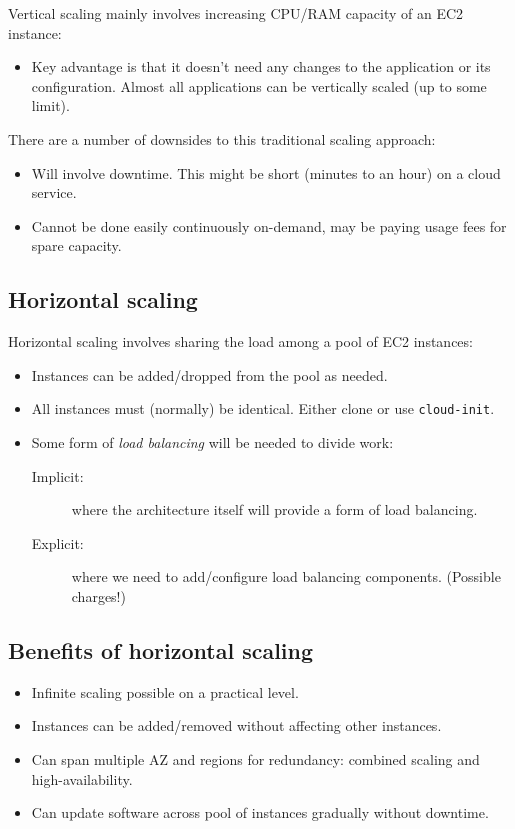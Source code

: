 \documentclass[slides]{pgnotes}
\begin{document}
Vertical scaling mainly involves increasing CPU/RAM capacity of an EC2 instance:
\begin{itemize}
\item Key advantage is that it doesn't need any changes to the application or its configuration.
  Almost all applications can be vertically scaled (up to some limit).
\end{itemize}
There are a number of downsides to this traditional scaling approach: 
\begin{itemize}
\item Will involve downtime.  This might be short (minutes to an hour) on a cloud service.
\item Cannot be done easily continuously on-demand, may be paying usage fees for spare capacity.
\end{itemize}

\subsection{Horizontal scaling}

Horizontal scaling involves sharing the load among a pool of EC2 instances:
\begin{itemize}
\item Instances can be added/dropped from the pool as needed.
\item All instances must (normally) be identical. Either clone or use \texttt{cloud-init}.
\item Some form of \textit{load balancing} will be needed to divide work:
  \begin{description}
  \item[Implicit:] where the architecture itself will provide a form of load balancing.
  \item[Explicit:] where we need to add/configure load balancing components. (Possible charges!)
  \end{description}    
\end{itemize}

\subsection{Benefits of horizontal scaling}
\begin{itemize}
\item Infinite scaling possible on a practical level. 
\item Instances can be added/removed without affecting other instances.
\item Can span multiple AZ and regions for redundancy: combined scaling and high-availability.
\item Can update software across pool of instances gradually without downtime.
\end{itemize}
\end{document}
